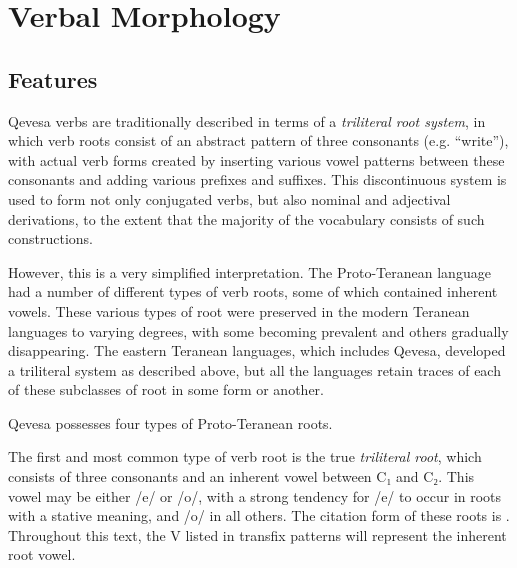 \documentclass[grammar]{subfiles}
\begin{document}
\chapter{Verbal Morphology}
\label{ch:verbal_morphology}


\section{Features}
\label{sec:vm_features}

Qevesa verbs are traditionally described in terms of a \emph{triliteral
  root system}, in which verb roots consist of an abstract pattern of three
consonants (e.g.  “write”), with actual verb forms created by
inserting various vowel patterns between these consonants and adding various
prefixes and suffixes.  This discontinuous system is used to form not only
conjugated verbs, but also nominal and adjectival derivations, to the extent
that the majority of the vocabulary consists of such constructions. 

However, this is a very simplified interpretation.  The Proto-Teranean language
had a number of different types of verb roots, some of which contained inherent
vowels.  These various types of root were preserved in the modern Teranean
languages to varying degrees, with some becoming prevalent and others gradually
disappearing.  The eastern Teranean languages, which includes Qevesa, developed
a triliteral system as described above, but all the languages retain traces of
each of these subclasses of root in some form or another. 

Qevesa possesses four types of Proto-Teranean roots. 


The first and most common type of verb root is the true \emph{triliteral root},
which consists of three consonants and an inherent vowel between C₁ and C₂.
This vowel may be either /e/ or /o/, with a strong tendency for /e/ to occur in
roots with a stative meaning, and /o/ in all others. The citation form of these
roots is .  Throughout this text, the V listed in transfix patterns
will represent the inherent root vowel.
\end{document}
